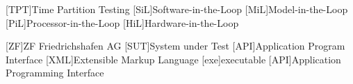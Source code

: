 \begin{acronym}[EuGH]


[TPT]{Time Partition Testing} 
[SiL]{Software-in-the-Loop} 
[MiL]{Model-in-the-Loop} 
[PiL]{Processor-in-the-Loop} 
[HiL]{Hardware-in-the-Loop} 

[ZF]{ZF Friedrichshafen AG}
[SUT]{System under Test}
[API]{Application Program Interface}
[XML]{Extensible Markup Language}
[exe]{executable}
[API]{Application Programming Interface}





\end{acronym}
